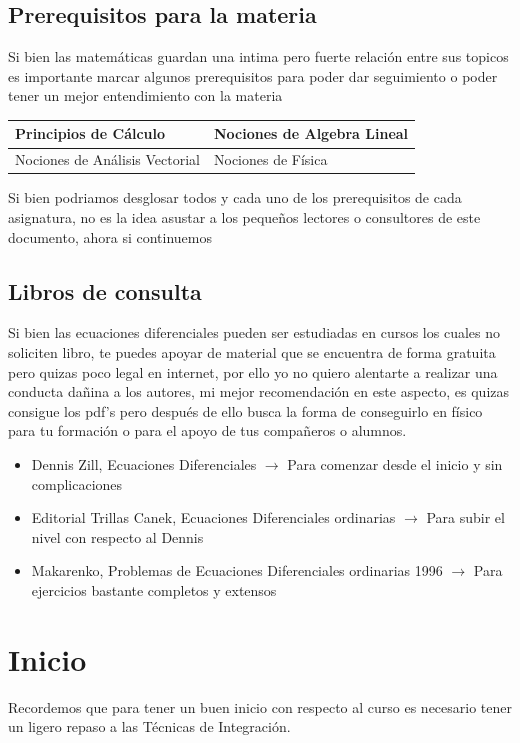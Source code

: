 \documentclass[10pt,executivepaper]{article}
\begin{document}
\subsection{Prerequisitos para la materia}
Si bien las matemáticas guardan una intima pero fuerte relación entre sus topicos es importante marcar algunos prerequisitos para poder dar seguimiento o poder tener un mejor entendimiento con la materia
\begin{center}
  \begin{tabular}{|p{5.5cm}|p{5.5cm}|}
    \hline
    Principios de Cálculo & Nociones de Algebra Lineal\\
    \hline
    Nociones de Análisis Vectorial & Nociones de Física\\
    \hline
  \end{tabular}
\end{center}
Si bien podriamos desglosar todos y cada uno de los prerequisitos de cada asignatura, no es la idea asustar a los pequeños lectores o consultores de este documento, ahora si continuemos

\subsection{Libros de consulta}
Si bien las ecuaciones diferenciales pueden ser estudiadas en cursos los cuales no soliciten libro, te puedes apoyar de material que se encuentra de forma gratuita pero quizas poco legal en internet, por ello yo no quiero alentarte a realizar una conducta dañina a los autores, mi mejor recomendación en este aspecto, es quizas consigue los pdf's pero después de ello busca la forma de conseguirlo en físico para tu formación o para el apoyo de tus compañeros o alumnos.
\begin{itemize}
  \item Dennis Zill, Ecuaciones Diferenciales $\rightarrow$ Para comenzar desde el inicio y sin complicaciones
  \item Editorial Trillas Canek, Ecuaciones Diferenciales ordinarias $\rightarrow$ Para subir el nivel con respecto al Dennis
  \item Makarenko, Problemas de Ecuaciones Diferenciales ordinarias 1996 $\rightarrow$ Para ejercicios bastante completos y extensos
\end{itemize}

\section{Inicio}
Recordemos que para tener un buen inicio con respecto al curso es necesario tener un ligero repaso a las Técnicas de Integración.
\end{document}
